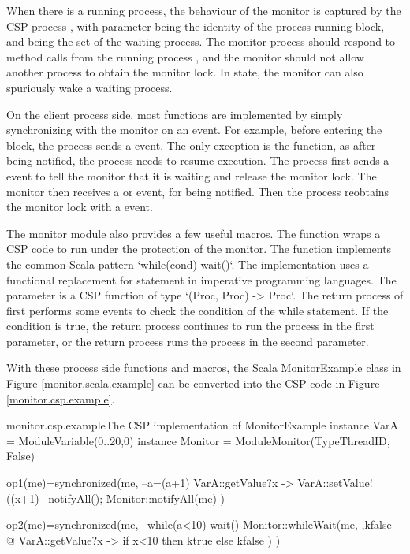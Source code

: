 \documentclass{article}
\begin{document}
When there is a running process, the behaviour of the monitor is captured by the CSP process , with parameter  being the identity of the process running  block, and  being the set of the waiting process. The monitor process should respond to method calls from the running process , and the monitor should not allow another process to obtain the monitor lock. In  state, the monitor can also spuriously wake a waiting process. 

On the client process side, most functions are implemented by simply synchronizing with the monitor on an event. For example, before entering the  block, the process sends a  event. The only exception is the  function, as after being notified, the process needs to resume execution. The process first sends a  event to tell the monitor that it is waiting and release the monitor lock. The monitor then receives a  or  event, for being notified. Then the process reobtains the monitor lock with a  event. 

The monitor module also provides a few useful macros. The  function wraps a CSP code to run under the protection of the monitor. The  function implements the common Scala pattern `while(cond) wait()`. The implementation uses a functional replacement for  statement in imperative programming languages. The  parameter is a CSP function of type `(Proc, Proc) -> Proc`. The return process of  first performs some events to check the condition of the while statement. If the condition is true, the return process continues to run the process in the first parameter, or the return process runs the process in the second parameter.

With these process side functions and macros, the Scala MonitorExample class in Figure \ref{monitor.scala.example} can be converted into the CSP code in Figure \ref{monitor.csp.example}.

\begin{cspinline}{monitor.csp.example}{The CSP implementation of MonitorExample}
instance VarA = ModuleVariable({0..20},0)
instance Monitor = ModuleMonitor(TypeThreadID, False)

op1(me)=synchronized(me,
  --a=(a+1)%
  VarA::getValue?x -> VarA::setValue!((x+1)%
  --notifyAll();
  Monitor::notifyAll(me)
)

op2(me)=synchronized(me,
  --while(a<10) wait()
  Monitor::whileWait(me, \ktrue,kfalse @
    VarA::getValue?x -> if x<10 then ktrue else kfalse
  )
)
\end{cspinline}
  
\end{document}
